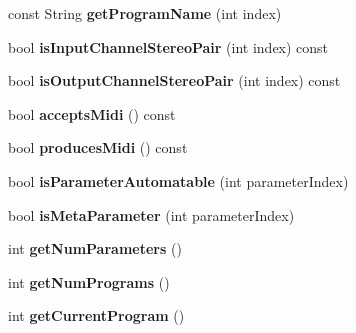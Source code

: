 \begin{DoxyCompactItemize}
\item 
\hypertarget{classGenericProcessor_a58b6841219060ffda3a8ed8f34eea3ed}{const String {\bfseries get\-Program\-Name} (int index)}\label{classGenericProcessor_a58b6841219060ffda3a8ed8f34eea3ed}

\item 
\hypertarget{classGenericProcessor_a8809dc1000c5efec6b81d8080e586d5a}{bool {\bfseries is\-Input\-Channel\-Stereo\-Pair} (int index) const }\label{classGenericProcessor_a8809dc1000c5efec6b81d8080e586d5a}

\item 
\hypertarget{classGenericProcessor_a81b7c0491e5f7d9577b07db5652bed6c}{bool {\bfseries is\-Output\-Channel\-Stereo\-Pair} (int index) const }\label{classGenericProcessor_a81b7c0491e5f7d9577b07db5652bed6c}

\item 
\hypertarget{classGenericProcessor_af9133c109e5251413b322145aa7620b2}{bool {\bfseries accepts\-Midi} () const }\label{classGenericProcessor_af9133c109e5251413b322145aa7620b2}

\item 
\hypertarget{classGenericProcessor_af93f01089518726922286c9bb74419ee}{bool {\bfseries produces\-Midi} () const }\label{classGenericProcessor_af93f01089518726922286c9bb74419ee}

\item 
\hypertarget{classGenericProcessor_af7af56aa3afd875ed377d54f2ddeb941}{bool {\bfseries is\-Parameter\-Automatable} (int parameter\-Index)}\label{classGenericProcessor_af7af56aa3afd875ed377d54f2ddeb941}

\item 
\hypertarget{classGenericProcessor_a9a666aa80a84fdffcb2f3cf8b7599183}{bool {\bfseries is\-Meta\-Parameter} (int parameter\-Index)}\label{classGenericProcessor_a9a666aa80a84fdffcb2f3cf8b7599183}

\item 
\hypertarget{classGenericProcessor_a37f3bb2d2c4aa385b41f324beecc03eb}{int {\bfseries get\-Num\-Parameters} ()}\label{classGenericProcessor_a37f3bb2d2c4aa385b41f324beecc03eb}

\item 
\hypertarget{classGenericProcessor_ad80d3c00c3f8fa1a719196a447b9670d}{int {\bfseries get\-Num\-Programs} ()}\label{classGenericProcessor_ad80d3c00c3f8fa1a719196a447b9670d}

\item 
\hypertarget{classGenericProcessor_a13228cdfe7cd15d89bcc7c4061e0a797}{int {\bfseries get\-Current\-Program} ()}\label{classGenericProcessor_a13228cdfe7cd15d89bcc7c4061e0a797}


\end{DoxyCompactItemize}
